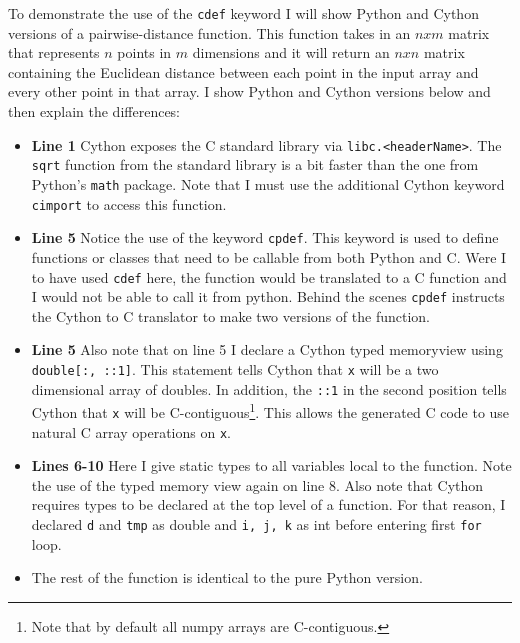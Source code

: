     To demonstrate the use of the \texttt{cdef} keyword I will show Python and Cython versions of a pairwise-distance function. This function takes in an $n x m$ matrix that represents $n$ points in $m$ dimensions and it will return an $n x n$ matrix containing the Euclidean distance between each point in the input array and every other point in that array. I show Python and Cython versions below and then explain the differences:

    \vspace{.2in}
    
    

    \begin{itemize}
      \item \textbf{Line 1} Cython exposes the C standard library via \texttt{libc.<headerName>}. The \texttt{sqrt} function from the standard library is a bit faster than the one from Python's \texttt{math} package. Note that I must use the additional Cython keyword \texttt{cimport} to access this function.
      \item \textbf{Line 5} Notice the use of the keyword \texttt{cpdef}. This keyword is used to define functions or classes that need to be callable from both Python and C. Were I to have used \texttt{cdef} here, the function would be translated to a C function and I would not be able to call it from python. Behind the scenes \texttt{cpdef} instructs the Cython to C translator to make two versions of the function.
      \item \textbf{Line 5} Also note that on line 5 I declare a Cython typed memoryview using \texttt{double[:, ::1]}. This statement tells Cython that \texttt{x} will be a two dimensional array of doubles. In addition, the \texttt{::1} in the second position tells Cython that \texttt{x} will be C-contiguous\footnote{Note that by default all numpy arrays are C-contiguous.}. This allows the generated C code to use natural C array operations on \texttt{x}.
      \item \textbf{Lines 6-10} Here I give static types to all variables local to the function. Note the use of the typed memory view again on line 8. Also note that Cython requires types to be declared at the top level of a function. For that reason, I declared \texttt{d} and \texttt{tmp} as double and \texttt{i, j, k} as int before entering first \texttt{for} loop.
      \item The rest of the function is identical to the pure Python version.
    \end{itemize}

